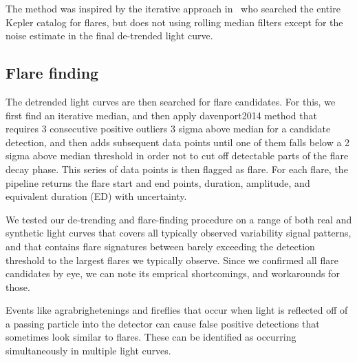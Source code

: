 \documentclass[fleqn,usenatbib,letters]{mnras}%
\begin{document}
The method was inspired by the iterative approach in~\citet{davenport2016} who searched the entire Kepler catalog for flares, but does not using rolling median filters except for the noise estimate in the final de-trended light curve. 

\subsection{Flare finding}

The detrended light curves are then searched for flare candidates. For this, we first find an iterative median, and then apply davenport2014 method that requires 3 consecutive positive outliers 3 sigma above median for a candidate detection, and then adds subsequent data points until one of them falls below a 2 sigma above median threshold in order not to cut off detectable parts of the flare decay phase. This series of data points is then flagged as flare. For each flare, the pipeline returns the flare start and end points, duration, amplitude, and equivalent duration (ED) with uncertainty.

We tested our de-trending and flare-finding procedure on a range of both real and synthetic light curves that covers all typically observed variability signal patterns, and that contains flare signatures between barely exceeding the detection threshold to the largest flares we typically observe. Since we confirmed all flare candidates by eye, we can note its emprical shortcomings, and workarounds for those. 

Events like agrabrighetenings and fireflies that occur when light is reflected off of a passing particle into the detector can cause false positive detections that sometimes look similar to flares. These can be identified as occurring simultaneously in multiple light curves.
\end{document}
